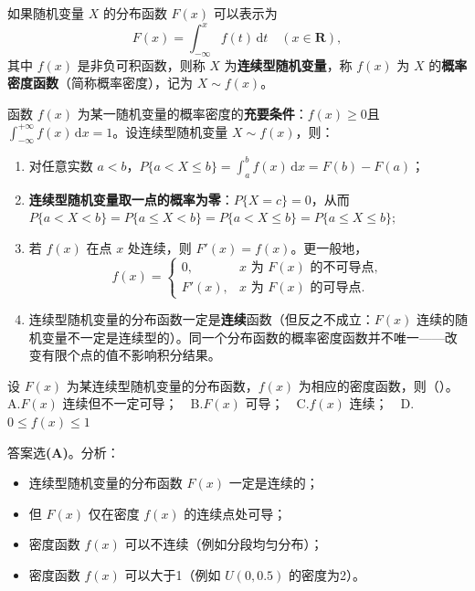 \documentclass[lang=cn,11pt]{elegantbook}
\begin{document}
\begin{definition}[连续型随机变量] \label{def:continuous-rv}
如果随机变量 $X$ 的分布函数 $F(x)$ 可以表示为
\[
F(x) = \int_{-\infty}^{x} f(t)\,\mathrm{d}t \quad (x \in \mathbf{R}),
\]
其中 $f(x)$ 是非负可积函数，则称 $X$ 为\textbf{连续型随机变量}，称 $f(x)$ 为 $X$ 的\textbf{概率密度函数}（简称概率密度），记为 $X \sim f(x)$。
\end{definition}


\begin{property}\label{prop:pdf-property}
函数 $f(x)$ 为某一随机变量的概率密度的\textbf{充要条件}：$f(x) \ge 0$且 $\displaystyle\int_{-\infty}^{+\infty} f(x)\,\mathrm{d}x = 1$。设连续型随机变量 $X \sim f(x)$，则：
\begin{enumerate}
    \item 对任意实数 $a < b$，$\displaystyle P\{a < X \le b\} = \int_a^b f(x)\,\mathrm{d}x = F(b) - F(a)$；
    \item \textbf{连续型随机变量取一点的概率为零}：$P\{X = c\} = 0$，从而
    \(
    P\{a < X < b\} = P\{a \le X < b\} = P\{a < X \le b\} = P\{a \le X \le b\};
    \)
    \item 若 $f(x)$ 在点 $x$ 处连续，则 $F'(x) = f(x)$。更一般地，
    \[
    f(x) = \begin{cases}
    0, & x \text{ 为 } F(x) \text{ 的不可导点}, \\
    F'(x), & x \text{ 为 } F(x) \text{ 的可导点}.
    \end{cases}
    \]
    \item 连续型随机变量的分布函数一定是\textbf{连续}函数（但反之不成立：$F(x)$ 连续的随机变量不一定是连续型的）。同一个分布函数的概率密度函数并不唯一——改变有限个点的值不影响积分结果。
\end{enumerate}
\end{property}

\begin{exercise} 
设 $F(x)$ 为某连续型随机变量的分布函数，$f(x)$ 为相应的密度函数，则（\quad）。\\
A.$F(x)$ 连续但不一定可导；~~B.$F(x)$ 可导；~~C.$f(x)$ 连续；~~D.$0\leqslant f(x)\leqslant1$
\end{exercise}
\begin{solution}
答案选\textbf{(A)}。分析：
\begin{itemize}
    \item 连续型随机变量的分布函数 $F(x)$ 一定是连续的；
    \item 但 $F(x)$ 仅在密度 $f(x)$ 的连续点处可导；
    \item 密度函数 $f(x)$ 可以不连续（例如分段均匀分布）；
    \item 密度函数 $f(x)$ 可以大于1（例如 $U(0,0.5)$ 的密度为2）。
\end{itemize}
\end{solution}
\end{document}
